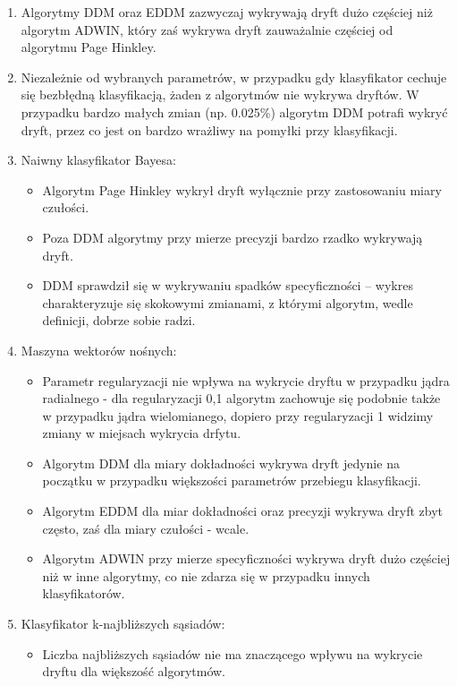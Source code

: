 \documentclass{classrep}
\begin{document}
\begin{enumerate}
    \item Algorytmy DDM oraz EDDM zazwyczaj wykrywają dryft dużo częściej niż algorytm ADWIN, który zaś wykrywa dryft zauważalnie częściej od algorytmu Page Hinkley.
    \item Niezależnie od wybranych parametrów, w przypadku gdy klasyfikator cechuje się bezbłędną klasyfikacją, żaden z algorytmów nie wykrywa dryftów. W przypadku bardzo małych zmian (np. 0.025\%) algorytm DDM potrafi wykryć dryft, przez co jest on bardzo wrażliwy na pomyłki przy klasyfikacji.
    \item Naiwny klasyfikator Bayesa:
    \begin{itemize}
        \item Algorytm Page Hinkley wykrył dryft wyłącznie przy zastosowaniu miary czułości.
        \item Poza DDM algorytmy przy mierze precyzji bardzo rzadko wykrywają dryft.
        \item DDM sprawdził się w wykrywaniu spadków specyficzności -- wykres charakteryzuje się skokowymi zmianami, z którymi algorytm, wedle definicji, dobrze sobie radzi.
    \end{itemize}
    \item Maszyna wektorów nośnych:
    \begin{itemize}
        \item Parametr regularyzacji nie wpływa na wykrycie dryftu w przypadku jądra radialnego - dla regularyzacji 0,1 algorytm zachowuje się podobnie także w przypadku jądra wielomianego, dopiero przy regularyzacji 1 widzimy zmiany w miejsach wykrycia drfytu.
        \item Algorytm DDM dla miary dokładności wykrywa dryft jedynie na początku w przypadku większości parametrów przebiegu  klasyfikacji.
        \item Algorytm EDDM dla miar dokładności oraz precyzji wykrywa dryft zbyt często, zaś dla miary czułości - wcale.
        \item Algorytm ADWIN przy mierze specyficzności wykrywa dryft dużo częściej niż w inne algorytmy, co nie zdarza się w przypadku innych klasyfikatorów.
    \end{itemize}
    \item Klasyfikator k-najbliższych sąsiadów:
    \begin{itemize}
        \item Liczba najbliższych sąsiadów nie ma znaczącego wpływu na wykrycie dryftu dla większość algorytmów.

\end{itemize}
\end{enumerate}
\end{document}
